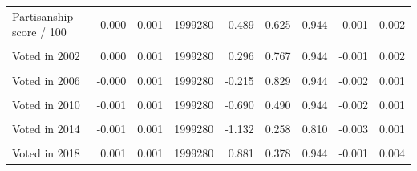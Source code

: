 \begin{table}
\begin{tabular}[t]{lrrrrrrrr}
Partisanship score / 100 & 0.000 & 0.001 & 1999280 & 0.489 & 0.625 & 0.944 & -0.001 & 0.002\\
\cellcolor{gray!10}{Voted in 2000} & \cellcolor{gray!10}{-0.000} & \cellcolor{gray!10}{0.001} & \cellcolor{gray!10}{1999280} & \cellcolor{gray!10}{-0.072} & \cellcolor{gray!10}{0.943} & \cellcolor{gray!10}{0.944} & \cellcolor{gray!10}{-0.002} & \cellcolor{gray!10}{0.002}\\
Voted in 2002 & 0.000 & 0.001 & 1999280 & 0.296 & 0.767 & 0.944 & -0.001 & 0.002\\
\cellcolor{gray!10}{Voted in 2004} & \cellcolor{gray!10}{0.000} & \cellcolor{gray!10}{0.001} & \cellcolor{gray!10}{1999280} & \cellcolor{gray!10}{0.161} & \cellcolor{gray!10}{0.872} & \cellcolor{gray!10}{0.944} & \cellcolor{gray!10}{-0.002} & \cellcolor{gray!10}{0.002}\\
Voted in 2006 & -0.000 & 0.001 & 1999280 & -0.215 & 0.829 & 0.944 & -0.002 & 0.001\\
\cellcolor{gray!10}{Voted in 2008} & \cellcolor{gray!10}{-0.001} & \cellcolor{gray!10}{0.001} & \cellcolor{gray!10}{1999280} & \cellcolor{gray!10}{-0.761} & \cellcolor{gray!10}{0.447} & \cellcolor{gray!10}{0.944} & \cellcolor{gray!10}{-0.003} & \cellcolor{gray!10}{0.001}\\
Voted in 2010 & -0.001 & 0.001 & 1999280 & -0.690 & 0.490 & 0.944 & -0.002 & 0.001\\
\cellcolor{gray!10}{Voted in 2012} & \cellcolor{gray!10}{0.000} & \cellcolor{gray!10}{0.001} & \cellcolor{gray!10}{1999280} & \cellcolor{gray!10}{0.252} & \cellcolor{gray!10}{0.801} & \cellcolor{gray!10}{0.944} & \cellcolor{gray!10}{-0.002} & \cellcolor{gray!10}{0.003}\\
Voted in 2014 & -0.001 & 0.001 & 1999280 & -1.132 & 0.258 & 0.810 & -0.003 & 0.001\\
\cellcolor{gray!10}{Voted in 2016} & \cellcolor{gray!10}{-0.000} & \cellcolor{gray!10}{0.001} & \cellcolor{gray!10}{1999280} & \cellcolor{gray!10}{-0.279} & \cellcolor{gray!10}{0.780} & \cellcolor{gray!10}{0.944} & \cellcolor{gray!10}{-0.003} & \cellcolor{gray!10}{0.002}\\
Voted in 2018 & 0.001 & 0.001 & 1999280 & 0.881 & 0.378 & 0.944 & -0.001 & 0.004\\
\bottomrule
\end{tabular}
\end{table}
